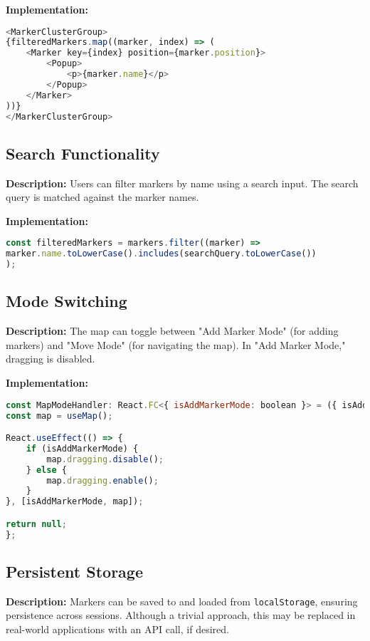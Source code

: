 \documentclass[11pt]{article}
\begin{document}
    \textbf{Implementation:}
    \begin{lstlisting}[language=javascript]
<MarkerClusterGroup>
{filteredMarkers.map((marker, index) => (
    <Marker key={index} position={marker.position}>
        <Popup>
            <p>{marker.name}</p>
        </Popup>
    </Marker>
))}
</MarkerClusterGroup>
    \end{lstlisting}

    \subsection{Search Functionality}
    \textbf{Description:} Users can filter markers by name using a search input. The search query is matched against the marker names.

    \textbf{Implementation:}
    \begin{lstlisting}[language=javascript]
const filteredMarkers = markers.filter((marker) =>
marker.name.toLowerCase().includes(searchQuery.toLowerCase())
);
    \end{lstlisting}

    \subsection{Mode Switching}
    \textbf{Description:} The map can toggle between "Add Marker Mode" (for adding markers) and "Move Mode" (for navigating the map). In "Add Marker Mode," dragging is disabled.

    \textbf{Implementation:}
    \begin{lstlisting}[language=javascript]
const MapModeHandler: React.FC<{ isAddMarkerMode: boolean }> = ({ isAddMarkerMode }) => {
const map = useMap();

React.useEffect(() => {
    if (isAddMarkerMode) {
        map.dragging.disable();
    } else {
        map.dragging.enable();
    }
}, [isAddMarkerMode, map]);

return null;
};
    \end{lstlisting}

    \subsection{Persistent Storage}
    \textbf{Description:} Markers can be saved to and loaded from \texttt{localStorage}, ensuring persistence across sessions. Although a trivial approach, this may be replaced in real-world applications with an API call, if desired.
\end{document}
